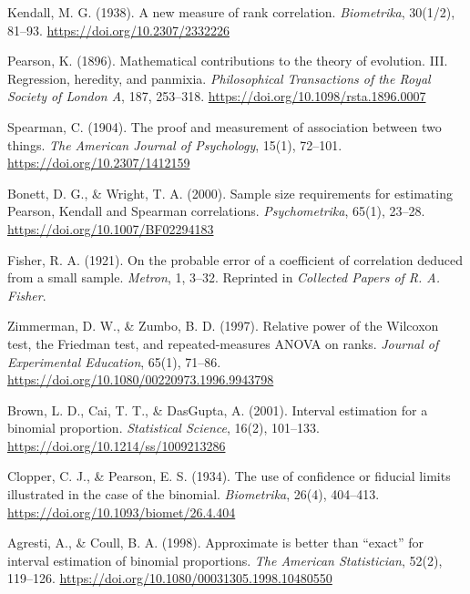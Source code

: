 \renewcommand{\section}[2]{\anonsection{Библиографический список}}


%

\begin{thebibliography}{9}

Kendall, M. G. (1938). A new measure of rank correlation. \emph{Biometrika}, 30(1/2), 81–93. \url{https://doi.org/10.2307/2332226}

Pearson, K. (1896). Mathematical contributions to the theory of evolution. III. Regression, heredity, and panmixia. \emph{Philosophical Transactions of the Royal Society of London A}, 187, 253–318. \url{https://doi.org/10.1098/rsta.1896.0007}

Spearman, C. (1904). The proof and measurement of association between two things. \emph{The American Journal of Psychology}, 15(1), 72–101. \url{https://doi.org/10.2307/1412159}

Bonett, D. G., \& Wright, T. A. (2000). Sample size requirements for estimating Pearson, Kendall and Spearman correlations. \emph{Psychometrika}, 65(1), 23–28. \url{https://doi.org/10.1007/BF02294183}

Fisher, R. A. (1921). On the probable error of a coefficient of correlation deduced from a small sample. \emph{Metron}, 1, 3–32. Reprinted in \emph{Collected Papers of R. A. Fisher}.

Zimmerman, D. W., \& Zumbo, B. D. (1997). Relative power of the Wilcoxon test, the Friedman test, and repeated-measures ANOVA on ranks. \emph{Journal of Experimental Education}, 65(1), 71–86. \url{https://doi.org/10.1080/00220973.1996.9943798}


Brown, L. D., Cai, T. T., \& DasGupta, A. (2001). Interval estimation for a binomial proportion. \textit{Statistical Science}, 16(2), 101–133. \url{https://doi.org/10.1214/ss/1009213286}

Clopper, C. J., \& Pearson, E. S. (1934). The use of confidence or fiducial limits illustrated in the case of the binomial. \textit{Biometrika}, 26(4), 404–413. \url{https://doi.org/10.1093/biomet/26.4.404}

Agresti, A., \& Coull, B. A. (1998). Approximate is better than “exact” for interval estimation of binomial proportions. \textit{The American Statistician}, 52(2), 119–126. \url{https://doi.org/10.1080/00031305.1998.10480550}

\end{thebibliography}



\clearpage